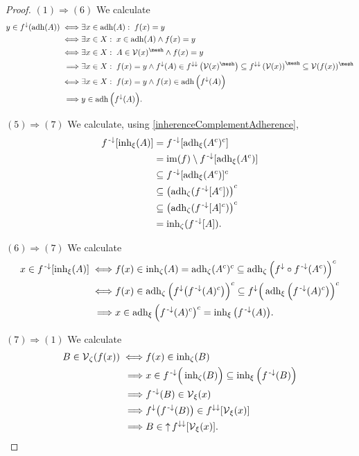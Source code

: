 \begin{proof}
$(1) \Rightarrow (6)$ We calculate
\begin{align*}
y\in f^\imf(\adh(A)) \iff& \exists x\in \adh(A):\;f(x) = y\\
\iff& \exists x\in X: \; x\in \adh(A) \land f(x) = y\\
\iff& \exists x\in X: \; A\in\vicinity(x)^{\mesh}  \land f(x) = y \\
\implies& \exists x\in X: \; f(x) = y \land f^\imf(A)\in f^{\imf\imf}\left(\vicinity(x)^{\mesh}\right) \subseteq f^{\imf\imf}\left(\vicinity(x)\right)^{\mesh} \subseteq \vicinity(f(x))^{\mesh} \\
\iff& \exists x\in X: \; f(x) = y \land f(x)\in \adh\Big(f^\imf(A)\Big) \\
\implies& y\in \adh\Big(f^\imf(A)\Big).
\end{align*}

$(5) \Rightarrow (7)$ We calculate, using \ref{inherenceComplementAdherence},
\begin{align*}
f^{\text{\hspace{0.15em}-}\downarrow}[\operatorname{inh}_\xi(A)] &= f^{\text{\hspace{0.15em}-}\downarrow}[\operatorname{adh}_\xi(A^c)^c] \\
&= \operatorname{im}(f)\setminus f^{{\text{\hspace{0.15em}-}\downarrow}}[\operatorname{adh}_\xi(A^c)] \\
&\subseteq f^{{\text{\hspace{0.15em}-}\downarrow}}[\operatorname{adh}_\xi(A^c)]^c \\
&\subseteq \left(\operatorname{adh}_\zeta(f^{{\text{\hspace{0.15em}-}\downarrow}}[A^c])\right)^c \\
&\subseteq \left(\operatorname{adh}_\zeta(f^{{\text{\hspace{0.15em}-}\downarrow}}[A]^c)\right)^c \\
&= \operatorname{inh}_\zeta(f^{{\text{\hspace{0.15em}-}\downarrow}}[A]).
\end{align*}

$(6) \Rightarrow (7)$ We calculate
\begin{align*}
x\in f^{\text{\hspace{0.15em}-}\downarrow}[\operatorname{inh}_\xi(A)] \iff& f(x) \in \operatorname{inh}_\zeta(A) = \operatorname{adh}_\zeta(A^c)^c \subseteq \operatorname{adh}_\zeta\Big(f^\downarrow\circ f^{{\text{\hspace{0.15em}-}\downarrow}}(A^c)\Big)^c \\
\iff& f(x) \in \operatorname{adh}_\zeta\Big(f^\downarrow\big(f^{{\text{\hspace{0.15em}-}\downarrow}}(A)^c\big)\Big)^c \subseteq f^\downarrow\Big(\operatorname{adh}_\xi\Big(f^{{\text{\hspace{0.15em}-}\downarrow}}(A)^c\big)\Big)^c \\
\implies& x\in \operatorname{adh}_\xi\Big(f^{{\text{\hspace{0.15em}-}\downarrow}}(A)^c\big)^c = \operatorname{inh}_\xi\big(f^{{\text{\hspace{0.15em}-}\downarrow}}(A)\big).
\end{align*}

$(7) \Rightarrow (1)$ We calculate
\begin{align*}
B\in \operatorname{\mathcal{V}}_\zeta(f(x)) \iff& f(x) \in \operatorname{inh}_\zeta(B) \\
\implies& x\in f^{{\text{\hspace{0.15em}-}\downarrow}}\Big(\operatorname{inh}_\zeta(B)\Big) \subseteq \operatorname{inh}_\xi\Big(f^{\text{\hspace{0.15em}-}\downarrow}(B)\Big) \\
\implies& f^{\text{\hspace{0.15em}-}\downarrow}(B) \in \operatorname{\mathcal{V}}_\xi(x) \\
\implies& f^\downarrow\big(f^{\text{\hspace{0.15em}-}\downarrow}(B)\big) \in f^{\downarrow\downarrow}[\operatorname{\mathcal{V}}_\xi(x)] \\
\implies& B \in \operatorname{\uparrow} f^{\downarrow\downarrow}[\operatorname{\mathcal{V}}_\xi(x)].
\end{align*}
\end{proof}
